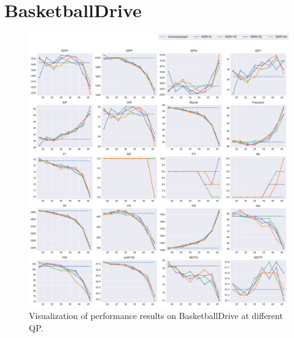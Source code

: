 
\section{BasketballDrive}
\label{sec:appendix/BasketballDrive_all}


\begin{figure}[!htbp]
\centering
\includegraphics[width=1.0\linewidth]{img/appendix/BasketballDrive_all_multiplots_qp.pdf}
\caption[Visualization of performance results on BasketballDrive at different QP]
{Visualization of performance results on BasketballDrive at different QP.}
\label{fig:BasketballDrive_all_qp}
\end{figure}

